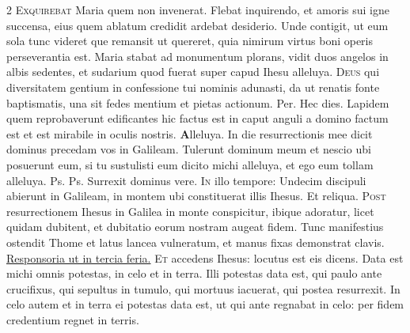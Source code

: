 \begin{multicols*}{2}
\lettrine[lines=2]{\zallmancaps \color{Red} E}{xquirebat} Maria quem non invenerat. Flebat inquirendo, et amoris sui igne succensa, eius quem ablatum credidit ardebat desiderio. Unde contigit, ut eum sola tunc videret que remansit ut quereret, quia nimirum virtus boni operis perseverantia est.
 Maria stabat ad monumentum plorans, vidit duos angelos in albis sedentes, et sudarium quod fuerat super capud Ihesu alleluya.
\lettrine[lines=2]{\zallmancaps \color{Blue} D}{eus} qui diversitatem gentium in confessione tui nominis adunasti, da ut renatis fonte baptismatis, una sit fedes mentium et pietas actionum. Per.
 \R Hec dies. \V Lapidem quem reprobaverunt edificantes hic factus est in caput anguli a domino factum est et est mirabile in oculis nostris. {\color{Red} \bfseries A}lleluya. \V In die resurrectionis mee dicit dominus precedam vos in Galileam.
 Tulerunt dominum meum et nescio ubi posuerunt eum, si tu sustulisti eum dicito michi alleluya, et ego eum tollam alleluya.
  {\color{Red} Ps.}  {\color{Red} Ps.}  \V Surrexit dominus vere.
\lettrine[lines=2]{\zallmancaps \color{Red} I}{n} illo tempore: Undecim discipuli abierunt in Galileam, in montem ubi constituerat illis Ihesus. Et reliqua.
\lettrine[lines=2]{\zallmancaps \color{Red} P}{ost} resurrectionem Ihesus in Galilea in monte conspicitur, ibique adoratur, licet quidam dubitent, et dubitatio eorum nostram augeat fidem. Tunc manifestius ostendit Thome et latus lancea vulneratum, et manus fixas demonstrat clavis. \ul{Responsoria ut in tercia feria.}
\lettrine[lines=2]{\zallmancaps \color{Blue} E}{t} accedens Ihesus: locutus est eis dicens. Data est michi omnis potestas, in celo et in terra. Illi potestas data est, qui paulo ante crucifixus, qui sepultus in tumulo, qui mortuus iacuerat, qui postea resurrexit. In celo autem et in terra ei potestas data est, ut qui ante regnabat in celo: per fidem credentium regnet in terris.

\end{multicols*}
